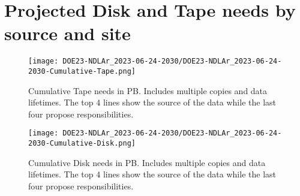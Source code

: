 \section{Projected Disk and Tape needs by source and site}
\begin{figure}[h]
\centering\texttt{[image: DOE23-NDLAr\_2023-06-24-2030/DOE23-NDLAr\_2023-06-24-2030-Cumulative-Tape.png]}
\caption{Cumulative Tape needs in PB. Includes multiple copies and data lifetimes. The top 4 lines show the source of the data while the last four propose responsibilities.}
\label{fig:Cumulative-Tape}
\end{figure}
\begin{figure}[h]
\centering\texttt{[image: DOE23-NDLAr\_2023-06-24-2030/DOE23-NDLAr\_2023-06-24-2030-Cumulative-Disk.png]}
\caption{Cumulative Disk needs in PB. Includes multiple copies and data lifetimes. The top 4 lines show the source of the data while the last four propose responsibilities.}
\label{fig:Cumulative-Disk}
\end{figure}
